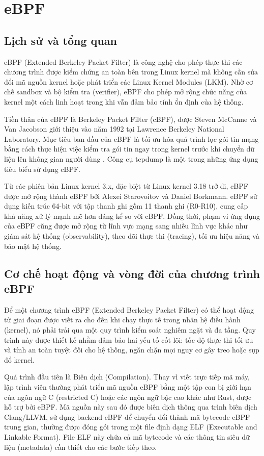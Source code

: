 \documentclass[../DoAn.tex]{subfiles}
\begin{document}
\section{eBPF}
\subsection{Lịch sử và tổng quan}
eBPF (Extended Berkeley Packet Filter) là công nghệ cho phép thực thi các chương trình được kiểm chứng an toàn bên trong Linux kernel mà không cần sửa đổi mã nguồn kernel hoặc phát triển các Linux Kernel Modules (LKM). Nhờ cơ chế sandbox và bộ kiểm tra (verifier), eBPF cho phép mở rộng chức năng của kernel một cách linh hoạt trong khi vẫn đảm bảo tính ổn định của hệ thống.

Tiền thân của eBPF là Berkeley Packet Filter (cBPF), được Steven McCanne và Van Jacobson giới thiệu vào năm 1992 tại Lawrence Berkeley National Laboratory. Mục tiêu ban đầu của cBPF là tối ưu hóa quá trình lọc gói tin mạng bằng cách thực hiện việc kiểm tra gói tin ngay trong kernel trước khi chuyển dữ liệu lên không gian người dùng \cite{mccanne1993bpf}. Công cụ tcpdump là một trong những ứng dụng tiêu biểu sử dụng cBPF.

Từ các phiên bản Linux kernel 3.x, đặc biệt từ Linux kernel 3.18 trở đi, cBPF được mở rộng thành eBPF bởi Alexei Starovoitov và Daniel Borkmann. eBPF sử dụng kiến trúc 64-bit với tập thanh ghi gồm 11 thanh ghi (R0-R10), cung cấp khả năng xử lý mạnh mẽ hơn đáng kể so với cBPF. Đồng thời, phạm vi ứng dụng của eBPF cũng được mở rộng từ lĩnh vực mạng sang nhiều lĩnh vực khác như giám sát hệ thống (observability), theo dõi thực thi (tracing), tối ưu hiệu năng và bảo mật hệ thống.
\subsection{Cơ chế hoạt động và vòng đời của chương trình eBPF}
Để một chương trình eBPF (Extended Berkeley Packet Filter) có thể hoạt động từ giai đoạn được viết ra cho đến khi chạy thực tế trong nhân hệ điều hành (kernel), nó phải trải qua một quy trình kiểm soát nghiêm ngặt và đa tầng. Quy trình này được thiết kế nhằm đảm bảo hai yếu tố cốt lõi: tốc độ thực thi tối ưu và tính an toàn tuyệt đối cho hệ thống, ngăn chặn mọi nguy cơ gây treo hoặc sụp đổ kernel.

Quá trình đầu tiên là Biên dịch (Compilation). Thay vì viết trực tiếp mã máy, lập trình viên thường phát triển mã nguồn eBPF bằng một tập con bị giới hạn của ngôn ngữ C (restricted C) hoặc các ngôn ngữ bậc cao khác như Rust, được hỗ trợ bởi eBPF. Mã nguồn này sau đó được biên dịch thông qua trình biên dịch Clang/LLVM, sử dụng backend eBPF để chuyển đổi thành mã bytecode eBPF trung gian, thường được đóng gói trong một file định dạng ELF (Executable and Linkable Format). File ELF này chứa cả mã bytecode và các thông tin siêu dữ liệu (metadata) cần thiết cho các bước tiếp theo.
\end{document}
